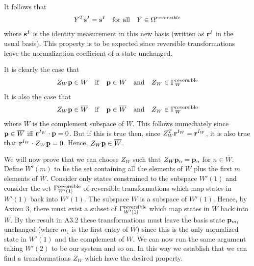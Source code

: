 \documentclass[10pt,twocolumn]{article}
\begin{document}
It follows that
\begin{equation}
Y^T{\bf s}^I ={\bf s}^I ~~~ {\rm for~all}~~~ Y\in\Omega^{reversible}
\end{equation}
where ${\bf s}^I$ is the identity measurement in this new basis (written
as ${\bf r}^I$ in the usual basis). This property is to be expected
since reversible transformations leave the normalization coefficient of
a state unchanged.

\vspace{4mm}


\vspace{4mm}

It is clearly the case that
\begin{equation}
Z_W {\bf p}\in W ~~~ {\rm if} ~~~ {\bf p}\in W  ~~~
{\rm and}~~~   Z_W\in\Gamma_W^{\rm reversible}
\end{equation}
It is also the case that
\begin{equation}
Z_W {\bf p}\in\overline{W} ~~~{\rm if}~~~ {\bf p}\in \overline{W}  ~~~
{\rm and}~~~   Z_W\in\Gamma_W^{\rm reversible}
\end{equation}
where $\overline{W}$ is the complement subspace of  $W$.
This follows immediately since ${\bf p}\in\overline{W}$ iff ${\bf
r}^{I_W}\cdot{\bf p}=0$.  But if this is true then, since $Z_W^T{\bf
r}^{I_W}={\bf r}^{I_W}$, it is also true that ${\bf
r}^{I_W}\cdot Z_W{\bf p}=0$. Hence, $Z_W{\bf p}\in\overline{W}$.

\vspace{4mm}


\vspace{4mm}

We will now prove that we can choose $Z_W$ such that $Z_W{\bf p}_n={\bf
p}_n$ for $n\in\overline{W}$.  Define $W'(m)$ to be the set containing
all the elements of $W$ plus the first $m$ elements of $\overline{W}$.
Consider only states constrained to the subspace $W'(1)$ and consider
the set $\Gamma^{\rm reversible}_{W'(1)}$ of reversible transformations
which map states in $W'(1)$ back into $W'(1)$.
The subspace $W$ is a subspace of $W'(1)$. Hence, by Axiom 3, there must
exist a subset of $\Gamma^{\rm reversible}_{W'(1)}$ which map states in
$W$ back into $W$.  By the result in A3.2 these transformations must
leave the basis state ${\bf p}_{m_1}$ unchanged (where $m_1$ is the
first entry of $\overline{W}$) since this is the only normalized state
in $W'(1)$ and the complement of $W$.  We can now run the same argument
taking $W'(2)$ to be our system and so on. In this way we establish that
we can find a transformations $Z_W$ which have the desired property.
\end{document}
